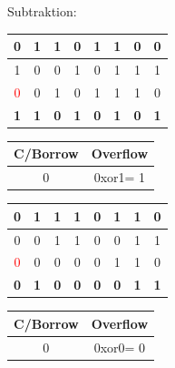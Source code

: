 Subtraktion: %
\begin{tabular}{|c|c|c|c|c|c|c|c|}
\hline 
0 & 1 & 1 & 0 & 1 & 1 & 0 & 0\tabularnewline
\hline 
1 & 0 & 0 & 1 & 0 & 1 & 1 & 1\tabularnewline
\hline 
\hline 
\textcolor{red}{0} & 0 & 1 & 0 & 1 & 1 & 1 & 0\tabularnewline
\hline 
\hline 
\textbf{1} & \textbf{1} & \textbf{0} & \textbf{1} & \textbf{0} & \textbf{1} & \textbf{0} & \textbf{1}\tabularnewline
\hline 
\end{tabular}%
\begin{tabular}{|c|c|}
\hline 
\textbf{C/Borrow} & \textbf{Overflow}\tabularnewline
\hline 
\hline 
0 & 0xor1= 1\tabularnewline
\hline 
\end{tabular}%
\begin{tabular}{|c|c|c|c|c|c|c|c|}
\hline 
0 & 1 & 1 & 1 & 0 & 1 & 1 & 0\tabularnewline
\hline 
0 & 0 & 1 & 1 & 0 & 0 & 1 & 1\tabularnewline
\hline 
\hline 
\textcolor{red}{0} & 0 & 0 & 0 & 0 & 1 & 1 & 0\tabularnewline
\hline 
\hline 
\textbf{0} & \textbf{1} & \textbf{0} & \textbf{0} & \textbf{0} & \textbf{0} & \textbf{1} & \textbf{1}\tabularnewline
\hline 
\end{tabular}%
\begin{tabular}{|c|c|}
\hline 
\textbf{C/Borrow} & \textbf{Overflow}\tabularnewline
\hline 
\hline 
0 & 0xor0= 0\tabularnewline
\hline 
\end{tabular}
